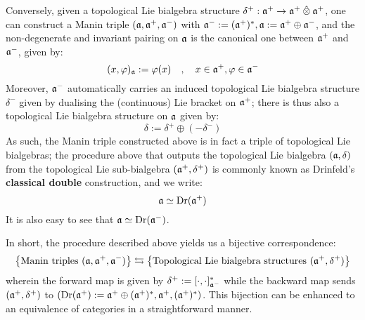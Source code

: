 Conversely, given a topological Lie bialgebra structure $\delta^+: \a^+ \to \a^+ \hattensor \a^+$, one can construct a Manin triple $(\mathfrak{a}, \mathfrak{a}^+, \mathfrak{a}^-)$ with $\mathfrak{a}^- := (\mathfrak{a}^+)^*, \mathfrak{a} := \mathfrak{a}^+ \oplus \mathfrak{a}^-$, and the non-degenerate and invariant pairing on $\mathfrak{a}$ is the canonical one between $\mathfrak{a}^+$ and $\mathfrak{a}^-$, given by:
    $$(x, \varphi)_{\mathfrak{a}} := \varphi(x) \quad, \quad x \in \mathfrak{a}^+, \varphi \in \mathfrak{a}^-$$
Moreover, $\mathfrak{a}^-$ automatically carries an induced topological Lie bialgebra structure $\delta^-$ given by dualising the (continuous) Lie bracket on $\mathfrak{a}^+$; there is thus also a topological Lie bialgebra structure on $\mathfrak{a}$ given by:
    $$\delta := \delta^+ \oplus (-\delta^-)$$
As such, the Manin triple constructed above is in fact a triple of topological Lie bialgebras; the procedure above that outputs the topological Lie bialgebra $(\mathfrak{a}, \delta)$ from the topological Lie sub-bialgebra $(\mathfrak{a}^+, \delta^+)$ is commonly known as Drinfeld's \textbf{classical double} construction, and we write:
    $$\mathfrak{a} \simeq \operatorname{Dr}(\mathfrak{a}^+)$$
It is also easy to see that $\mathfrak{a} \simeq \operatorname{Dr}(\mathfrak{a}^-)$.

In short, the procedure described above yields us a bijective correspondence:
    \begin{equation} \label{equation: manin_triple_lie_bialgebra_correspondence}
        \left\{ \text{Manin triples $(\mathfrak{a}, \mathfrak{a}^+, \mathfrak{a}^-)$} \right\} \leftrightarrows \left\{ \text{Topological Lie bialgebra structures $(\mathfrak{a}^+, \delta^+)$} \right\}
    \end{equation}
wherein the forward map is given by $\delta^+ := [\cdot, \cdot]^*_{\mathfrak{a}^-}$ while the backward map sends $(\mathfrak{a}^+, \delta^+)$ to $(\operatorname{Dr}(\mathfrak{a}^+) := \mathfrak{a}^+ \oplus (\mathfrak{a}^+)^*, \mathfrak{a}^+, (\mathfrak{a}^+)^*)$. This bijection can be enhanced to an equivalence of categories in a straightforward manner.